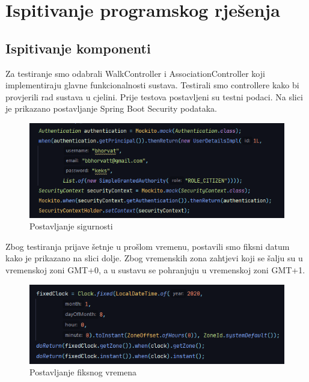 \eject 

\section{Ispitivanje programskog rješenja}

	\subsection{Ispitivanje komponenti}

	
	\noindent Za testiranje smo odabrali WalkController i AssociationController koji implementiraju glavne funkcionalnosti sustava. Testirali smo controllere kako bi provjerili rad sustava u cjelini. Prije testova postavljeni su testni podaci. Na slici je prikazano postavljanje Spring Boot Security podataka.

	\begin{figure}[H]
		\includegraphics[width=\linewidth]{slike/Testovi-1.png}
		\centering
		\caption{Postavljanje sigurnosti}
		\label{fig:testovi1}
	\end{figure}

	\noindent Zbog testiranja prijave šetnje u prošlom vremenu, postavili smo fiksni datum kako je prikazano na slici dolje. Zbog vremenskih zona zahtjevi koji se šalju su u vremenskoj zoni GMT+0, a u sustavu se pohranjuju u vremenskoj zoni GMT+1.

	\begin{figure}[H]
		\includegraphics[width=\linewidth]{slike/Testovi-2.png}
		\centering
		\caption{Postavljanje fiksnog vremena}
		\label{fig:testovi2}
	\end{figure}

